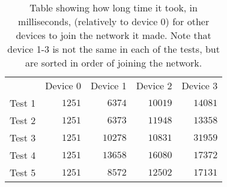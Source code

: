 \begin{table}[h]
\centering
\begin{tabular}{lllll}
                            & Device 0                  & Device 1                   & Device 2                   & Device 3                   \\ \cline{2-5} 
\multicolumn{1}{r|}{Test 1} & \multicolumn{1}{r|}{$1251$} & \multicolumn{1}{r|}{$6374$}  & \multicolumn{1}{r|}{$10019$} & \multicolumn{1}{r|}{$14081$} \\ \cline{2-5} 
\multicolumn{1}{r|}{Test 2} & \multicolumn{1}{r|}{$1251$} & \multicolumn{1}{r|}{$6373$}  & \multicolumn{1}{r|}{$11948$} & \multicolumn{1}{r|}{$13358$} \\ \cline{2-5} 
\multicolumn{1}{r|}{Test 3} & \multicolumn{1}{r|}{$1251$} & \multicolumn{1}{r|}{$10278$} & \multicolumn{1}{r|}{$10831$} & \multicolumn{1}{r|}{$31959$} \\ \cline{2-5} 
\multicolumn{1}{r|}{Test 4} & \multicolumn{1}{r|}{$1251$} & \multicolumn{1}{r|}{$13658$} & \multicolumn{1}{r|}{$16080$} & \multicolumn{1}{r|}{$17372$} \\ \cline{2-5} 
\multicolumn{1}{r|}{Test 5} & \multicolumn{1}{r|}{$1251$} & \multicolumn{1}{r|}{$8572$}  & \multicolumn{1}{r|}{$12502$} & \multicolumn{1}{r|}{$17131$} \\ \cline{2-5} 
\end{tabular}
\caption{Table showing how long time it took, in milliseconds, (relatively to device 0) for other devices to join the network it made. Note that device 1-3 is not the same in each of the tests, but are sorted in order of joining the network.}
\label{tab:ccrc_test}
\end{table}